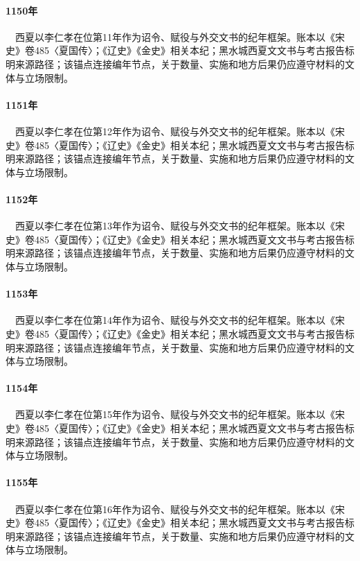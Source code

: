 \paragraph{1150年}　西夏以李仁孝在位第11年作为诏令、赋役与外交文书的纪年框架。账本以《宋史》卷485〈夏国传〉；《辽史》《金史》相关本纪；黑水城西夏文文书与考古报告标明来源路径；该锚点连接编年节点，关于数量、实施和地方后果仍应遵守材料的文体与立场限制。

\paragraph{1151年}　西夏以李仁孝在位第12年作为诏令、赋役与外交文书的纪年框架。账本以《宋史》卷485〈夏国传〉；《辽史》《金史》相关本纪；黑水城西夏文文书与考古报告标明来源路径；该锚点连接编年节点，关于数量、实施和地方后果仍应遵守材料的文体与立场限制。

\paragraph{1152年}　西夏以李仁孝在位第13年作为诏令、赋役与外交文书的纪年框架。账本以《宋史》卷485〈夏国传〉；《辽史》《金史》相关本纪；黑水城西夏文文书与考古报告标明来源路径；该锚点连接编年节点，关于数量、实施和地方后果仍应遵守材料的文体与立场限制。

\paragraph{1153年}　西夏以李仁孝在位第14年作为诏令、赋役与外交文书的纪年框架。账本以《宋史》卷485〈夏国传〉；《辽史》《金史》相关本纪；黑水城西夏文文书与考古报告标明来源路径；该锚点连接编年节点，关于数量、实施和地方后果仍应遵守材料的文体与立场限制。

\paragraph{1154年}　西夏以李仁孝在位第15年作为诏令、赋役与外交文书的纪年框架。账本以《宋史》卷485〈夏国传〉；《辽史》《金史》相关本纪；黑水城西夏文文书与考古报告标明来源路径；该锚点连接编年节点，关于数量、实施和地方后果仍应遵守材料的文体与立场限制。

\paragraph{1155年}　西夏以李仁孝在位第16年作为诏令、赋役与外交文书的纪年框架。账本以《宋史》卷485〈夏国传〉；《辽史》《金史》相关本纪；黑水城西夏文文书与考古报告标明来源路径；该锚点连接编年节点，关于数量、实施和地方后果仍应遵守材料的文体与立场限制。

